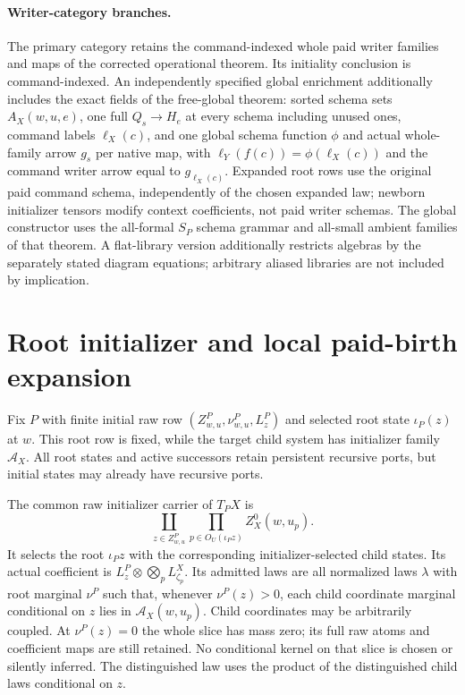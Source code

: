 \documentclass[11pt]{article}
\begin{document}
\paragraph{Writer-category branches.} The primary category retains the command-indexed whole paid writer families and maps of the corrected operational theorem. Its initiality conclusion is command-indexed. An independently specified global enrichment additionally includes the exact fields of the free-global theorem: sorted schema sets $A_X(w,u,e)$, one full $Q_s\to H_e$ at every schema including unused ones, command labels $\ell_X(c)$, and one global schema function $\phi$ and actual whole-family arrow $g_s$ per native map, with $\ell_Y(f(c))=\phi(\ell_X(c))$ and the command writer arrow equal to $g_{\ell_X(c)}$. Expanded root rows use the original paid command schema, independently of the chosen expanded law; newborn initializer tensors modify context coefficients, not paid writer schemas. The global constructor uses the all-formal $S_P$ schema grammar and all-small ambient families of that theorem. A flat-library version additionally restricts algebras by the separately stated diagram equations; arbitrary aliased libraries are not included by implication.

\section{Root initializer and local paid-birth expansion}
Fix $P$ with finite initial raw row $(Z^P_{w,u},\nu^P_{w,u},L^P_z)$ and selected root state $\iota_P(z)$ at $w$. This root row is fixed, while the target child system has initializer family $\mathcal A_X$. All root states and active successors retain persistent recursive ports, but initial states may already have recursive ports.

The common raw initializer carrier of $T_PX$ is
\[
 \coprod_{z\in Z^P_{w,u}}\prod_{p\in O_U(\iota_Pz)}Z_X^0(w,u_p).
\]
It selects the root $\iota_Pz$ with the corresponding initializer-selected child states. Its actual coefficient is $L^P_z\otimes\bigotimes_pL^X_{\zeta_p}$. Its admitted laws are all normalized laws $\lambda$ with root marginal $\nu^P$ such that, whenever $\nu^P(z)>0$, each child coordinate marginal conditional on $z$ lies in $\mathcal A_X(w,u_p)$. Child coordinates may be arbitrarily coupled. At $\nu^P(z)=0$ the whole slice has mass zero; its full raw atoms and coefficient maps are still retained. No conditional kernel on that slice is chosen or silently inferred. The distinguished law uses the product of the distinguished child laws conditional on $z$.
\end{document}
